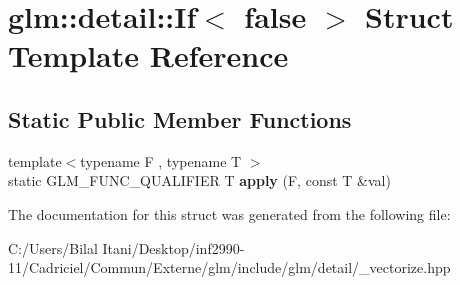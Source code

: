 \hypertarget{structglm_1_1detail_1_1_if_3_01false_01_4}{}\section{glm\+:\+:detail\+:\+:If$<$ false $>$ Struct Template Reference}
\label{structglm_1_1detail_1_1_if_3_01false_01_4}
\subsection*{Static Public Member Functions}
\begin{DoxyCompactItemize}
\item 
{\footnotesize template$<$typename F , typename T $>$ }\\static G\+L\+M\+\_\+\+F\+U\+N\+C\+\_\+\+Q\+U\+A\+L\+I\+F\+I\+ER T {\bfseries apply} (F, const T \&val)\hypertarget{structglm_1_1detail_1_1_if_3_01false_01_4_a31a9409e47dc11cb7d4251c12342b9f6}{}\label{structglm_1_1detail_1_1_if_3_01false_01_4_a31a9409e47dc11cb7d4251c12342b9f6}

\end{DoxyCompactItemize}


The documentation for this struct was generated from the following file\+:\begin{DoxyCompactItemize}
\item 
C\+:/\+Users/\+Bilal Itani/\+Desktop/inf2990-\/11/\+Cadriciel/\+Commun/\+Externe/glm/include/glm/detail/\+\_\+vectorize.\+hpp\end{DoxyCompactItemize}
